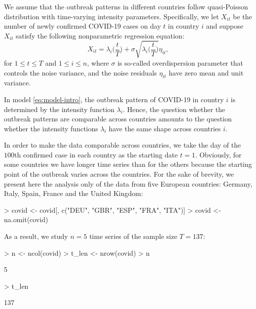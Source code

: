 \documentclass[a4paper]{scrartcl}
\begin{document}
We assume that the outbreak patterns in different countries follow quasi-Poisson distribution with time-varying intensity parameters. Specifically, we let $X_{it}$ be the number of newly confirmed COVID-19 cases on day $t$ in country $i$ and suppose $X_{it}$ satisfy the following nonparametric regression equation:
\begin{equation}\label{eq:model-intro}
X_{it} = \lambda_i\Big(\frac{t}{T}\Big) + \sigma \sqrt{\lambda_i\Big(\frac{t}{T}\Big)}\eta_{it},
\end{equation}
for $1 \le t \le T$ and $1 \le i \le n$, where $\sigma$ is so-called overdispersion parameter that controls the noise variance, and the noise residuals $\eta_{it}$ have zero mean and unit variance.

In model \eqref{eq:model-intro}, the outbreak pattern of COVID-19 in country $i$ is determined by the intensity function $\lambda_i$. Hence, the question whether the outbreak patterns are comparable across countries amounts to the question whether the intensity functions $\lambda_i$ have the same shape across countries $i$.

In order to make the data comparable across countries, we take the day of the $100$th confirmed case in each country as the starting date $t = 1$. Obviously, for some countries we have longer time series than for the others because the starting point of the outbreak varies across the countries. For the sake of brevity, we present here the analysis only of the data from five European countries: Germany, Italy, Spain, France and the United Kingdom:

\begin{Schunk}
\begin{Sinput}
> covid <- covid[, c("DEU", "GBR", "ESP", "FRA", "ITA")]
> covid <- na.omit(covid)
\end{Sinput}
\end{Schunk}

As a result, we study $n = 5$ time series of the sample size $T = 137$:

\begin{Schunk}
\begin{Sinput}
> n     <- ncol(covid)
> t_len <- nrow(covid)
> n
\end{Sinput}
\begin{Soutput}
[1] 5
\end{Soutput}
\begin{Sinput}
> t_len
\end{Sinput}
\begin{Soutput}
[1] 137
\end{Soutput}
\end{Schunk}
\end{document}
